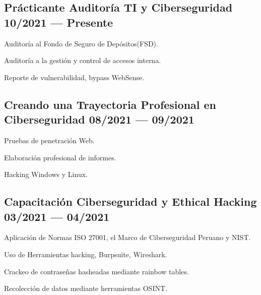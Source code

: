 \documentclass[letter,10pt]{article}
\begin{document}
\subsection{{Prácticante Auditoría TI y Ciberseguridad \hfill 10/2021 --- Presente}}
\begin{zitemize}
\item Auditoría al Fondo de Seguro de Depósitos(FSD).
\item Auditoría a la gestión y control de accesos interna.
\item Reporte de vulnerabilidad, bypass WebSense.
\end{zitemize}

\subsection{{Creando una Trayectoria Profesional en
Ciberseguridad \hfill 08/2021 --- 09/2021}}
\begin{zitemize}
\item Pruebas de penetración Web.
\item Elaboración profesional de informes.
\item Hacking Windows y Linux.
\end{zitemize}

\subsection{{Capacitación Ciberseguridad y Ethical Hacking \hfill 03/2021 --- 04/2021}}
\begin{zitemize}
\item Aplicación de Normas ISO 27001, el Marco de Ciberseguridad Peruano y NIST.
\item Uso de Herramientas hacking, Burpsuite, Wireshark.
\item Crackeo de contraseñas hasheadas mediante rainbow tables.
\item Recolección de datos mediante herramientas OSINT.
\end{zitemize}

\end{document}

